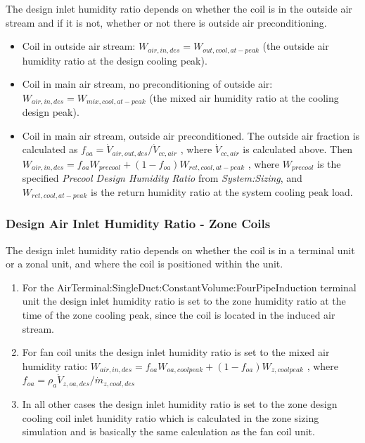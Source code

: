 The design inlet humidity ratio depends on whether the coil is in the outside air stream and if it is not, whether or not there is outside air preconditioning.

\begin{itemize}
\item
  Coil in outside air stream: \(W_{air,in,des} = W_{out,cool,at-peak}\) (the outside air humidity ratio at the design cooling peak).
\item
  Coil in main air stream, no preconditioning of outside air: \(W_{air,in,des} = W_{mix,cool,at-peak}\) (the mixed air humidity ratio at the cooling design peak).
\item
  Coil in main air stream, outside air preconditioned. The outside air fraction is calculated as \(f_{oa} = \dot V_{air,out,des}/\dot V_{cc,air}\) , where \(\dot V_{cc,air}\) is calculated above. Then \(W_{air,in,des} = f_{oa}W_{precool}+\left(1-f_{oa}\right)W_{ret,cool,at-peak}\) , where \(W_{precool}\) is the specified \emph{Precool Design Humidity Ratio} from \emph{System:Sizing}, and \(W_{ret,cool,at-peak}\) is the return humidity ratio at the system cooling peak load.
\end{itemize}

\subsubsection{Design Air Inlet Humidity Ratio - Zone Coils}\label{design-air-inlet-humidity-ratio---zone-coils}

The design inlet humidity ratio depends on whether the coil is in a terminal unit or a zonal unit, and where the coil is positioned within the unit.

\begin{enumerate}
\def\labelenumi{\arabic{enumi}.}
\item
  For the AirTerminal:SingleDuct:ConstantVolume:FourPipeInduction terminal unit the design inlet humidity ratio is set to the zone humidity ratio at the time of the zone cooling peak, since the coil is located in the induced air stream.
\item
  For fan coil units the design inlet humidity ratio is set to the mixed air humidity ratio: \(W_{air,in,des} = f_{oa}W_{oa,coolpeak} + \left(1-f_{oa}\right)W_{z,coolpeak}\) , where \(f_{oa} = \rho_a \dot V_{z,oa,des} / \dot m_{z,cool,des}\)
\item
  In all other cases the design inlet humidity ratio is set to the zone design cooling coil inlet hunidity ratio which is calculated in the zone sizing simulation and is basically the same calculation as the fan coil unit.
\end{enumerate}

